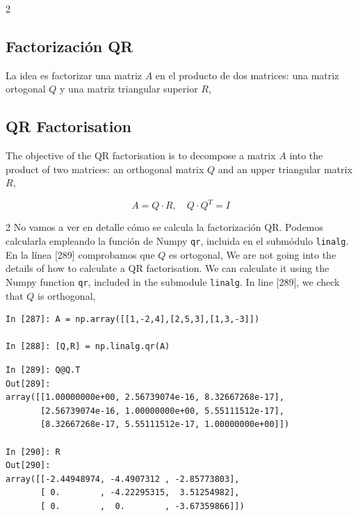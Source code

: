 \begin{paracol}{2}
\subsection{Factorización QR} \label{QR}
La idea es factorizar una matriz $A$ en el producto de dos matrices: una matriz ortogonal $Q$ y una matriz triangular superior $R$,
\switchcolumn
\subsection{QR Factorisation}
The objective of the QR factorisation is to decompose a matrix $A$ into the product of two matrices: an orthogonal matrix $Q$ and an upper triangular matrix $R$,
\end{paracol}
\begin{equation*}
A=Q\cdot R, \quad Q\cdot Q^T=I
\end{equation*}
\begin{paracol}{2}
No vamos a ver en detalle cómo se calcula la factorización QR. Podemos calcularla empleando la función de Numpy \texttt{qr}, incluida en el submódulo \texttt{linalg}. En la línea [289] comprobamos que $Q$ es ortogonal,
\switchcolumn
We are not going into the details of how to calculate a QR factorisation. We can calculate it using the Numpy function \texttt{qr}, included in the submodule \texttt{linalg}. In line [289], we check that $Q$ is orthogonal,
\end{paracol}
\begin{center}
    \begin{minipage}{0.7\textwidth}
    \begin{verbatim}
In [287]: A = np.array([[1,-2,4],[2,5,3],[1,3,-3]])

In [288]: [Q,R] = np.linalg.qr(A)
\end{verbatim}    
\end{minipage}
\end{center}
\begin{center}
\begin{minipage}{0.9\textwidth}
\begin{verbatim}
In [289]: Q@Q.T
Out[289]: 
array([[1.00000000e+00, 2.56739074e-16, 8.32667268e-17],
       [2.56739074e-16, 1.00000000e+00, 5.55111512e-17],
       [8.32667268e-17, 5.55111512e-17, 1.00000000e+00]])

In [290]: R
Out[290]: 
array([[-2.44948974, -4.4907312 , -2.85773803],
       [ 0.        , -4.22295315,  3.51254982],
       [ 0.        ,  0.        , -3.67359866]])
    \end{verbatim}    
    \end{minipage}
\end{center}

